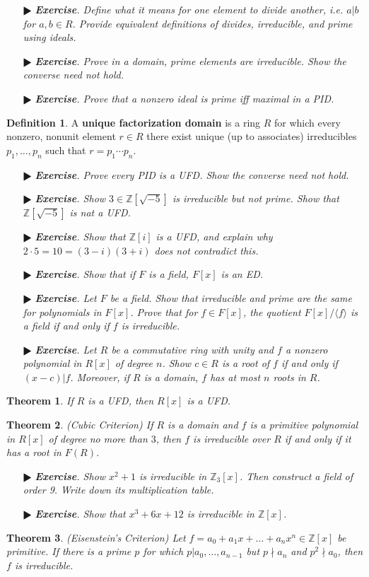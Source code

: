 \documentclass[11pt]{amsart}
\newtheorem*{theorem*}{Theorem}
\theoremstyle{definition}
\newtheorem*{definition*}{Definition}
\renewcommand\:{\colon}
\newcommand{\Z}{\mathds{Z}}
\newcommand{\1}{\mathds{1}}
\newcommand{\exc}[1]{\vspace{-2.5pt}\begin{itemize}[leftmargin=15pt]\item[$\RHD$] \textit{\textbf{Exercise}. #1}\end{itemize}}
\begin{document}
\exc{Define what it means for one element to divide another, i.e. $a|b$ for $a, b \in R$. Provide equivalent definitions of divides, irreducible, and prime using ideals.}
\exc{Prove in a domain, prime elements are irreducible. Show the converse need not hold.}
\exc{Prove that a nonzero ideal is prime iff maximal in a PID.}

\begin{definition*}
	A \textbf{unique factorization domain} is a ring $R$ for which every nonzero, nonunit element $r \in R$ there exist unique (up to associates) irreducibles $p_1, \dots, p_n$ such that $r = p_1 \cdots p_n$.
\end{definition*}

\exc{Prove every PID is a UFD. Show the converse need not hold.}
\exc{Show $3 \in \Z[\sqrt{-5}]$ is irreducible but not prime. Show that $\Z[\sqrt{-5}]$ is nat a UFD.}
\exc{Show that $\Z[i]$ is a UFD, and explain why $2 \cdot 5 = 10 = (3 - i)(3 + i)$ does not contradict this.}
\exc{Show that if $F$ is a field, $F[x]$ is an ED.}
\exc{Let $F$ be a field. Show that irreducible and prime are the same for polynomials in $F[x]$. Prove that for $f \in F[x]$, the quotient $F[x]/\langle f \rangle$ is a field if and only if $f$ is irreducible.}
\exc{Let $R$ be a commutative ring with unity and $f$ a nonzero polynomial in $R[x]$ of degree $n$. Show $c \in R$ is a root of $f$ if and only if $(x - c) | f$. Moreover, if $R$ is a domain, $f$ has at most $n$ roots in $R$.}

\begin{theorem*}
	If $R$ is a UFD, then $R[x]$ is a UFD.
\end{theorem*}

\begin{theorem*}
	\textnormal{(Cubic Criterion)} If $R$ is a domain and $f$ is a primitive polynomial in $R[x]$ of degree no more than $3$, then $f$ is irreducible over $R$ if and only if it has a root in $F(R)$.
\end{theorem*}

\exc{Show $x^2 + 1$ is irreducible in $\Z_3[x]$. Then construct a field of order 9. Write down its multiplication table.}
\exc{Show that $x^3 + 6x + 12$ is irreducible in $\Z[x]$.}

\begin{theorem*}
	\textnormal{(Eisenstein's Criterion)} Let $f = a_0 + a_1x + \dots + a_nx^n \in \Z[x]$ be primitive. If there is a prime $p$ for which $p | a_0, \dots, a_{n-1}$ but $p \nmid a_n$ and $p^2 \nmid a_0$, then $f$ is irreducible.
\end{theorem*}
\end{document}
